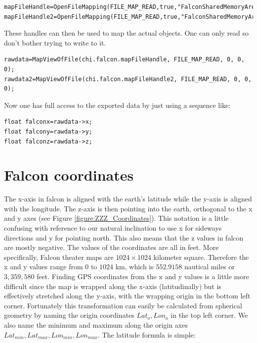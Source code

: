 \documentclass[11pt,letterpaper,titlepage]{article}
\begin{document}
\begin{lstlisting}
mapFileHandle=OpenFileMapping(FILE_MAP_READ,true,"FalconSharedMemoryArea");
mapFileHandle2=OpenFileMapping(FILE_MAP_READ,true,"FalconSharedMemoryArea2");
\end{lstlisting}

\noindent These handles can then be used to map the actual objects. One can only read so don't bother trying to write to it.

\begin{lstlisting}
rawdata=MapViewOfFile(chi.falcon.mapFileHandle, FILE_MAP_READ, 0, 0, 0);
rawdata2=MapViewOfFile(chi.falcon.mapFileHandle2, FILE_MAP_READ, 0, 0, 0);
\end{lstlisting}


\noindent
Now one has full access to the exported data by just using a sequence like:

\begin{lstlisting}
float falconx=rawdata->x;
float falcony=rawdata->y;
float falconz=rawdata->z;
\end{lstlisting}



\newpage
{}
\section{Falcon coordinates}
The x-axis in falcon is aligned with the earth's latitude while the y-axis is aligned with the longitude. The z-axis is then pointing into the earth, orthogonal to the x and y axes (see Figure \ref{figure:ZZZ_Coordinates}). This notation is a little confusing with reference to our natural inclination to use x for sideways directions and y for pointing north. This also means that the z values in falcon are mostly negative.
\newline
\newline
The values of the coordinates are all in feet. More specifically, Falcon theater maps are $1024 \times 1024$ kilometer square. Therefore the x and y values range from 0 to $1024$ km, which is $552.9158$ nautical miles or $3,359,580$ feet. Finding GPS coordinates from the x and y values is a little more difficult since the map is wrapped along the x-axis (latitudinally) but is effectively stretched along the y-axis, with the wrapping origin in the bottom left corner. Fortunately this transformation can easily be calculated from spherical geometry by naming the origin coordinates $Lat_o,Lon_o$ in the top left corner. We also name the minimum and maximum along the origin axes $Lat_{min}, Lat_{max}, Lon_{min}, Lon_{max}$. The latitude formula is simple:
\end{document}
